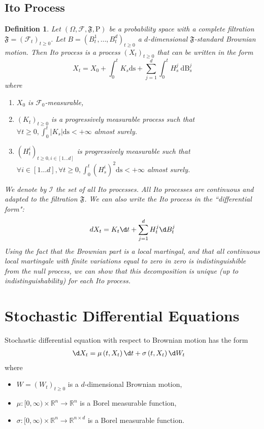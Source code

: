 \documentclass{report}
\newtheorem{definition}{Definition}[section]
\theoremstyle{nonumberplain}
\begin{document}
\section{Ito Process}
\begin{definition}
	Let $(\Omega, \mathcal{F}, \mathfrak{F}, \mathrm{P})$ be a probability space with a complete filtration $\mathfrak{F}=\left(\mathcal{F}_t\right)_{t \geq 0}$. Let $B=\left(B_t^1, \ldots, B_t^d\right)_{t \geq 0}$ a $d$-dimensional $\mathfrak{F}$-standard Brownian motion. Then Ito process is a process $\left(X_t\right)_{t \geq 0}$ that can be written in the form
$$
X_t=X_0+\int_0^t K_s \mathrm{ds}+\sum_{j=1}^d \int_0^t H_s^j \mathrm{~dB}_s^j
$$
where
\begin{enumerate}
	\item $X_0$ is $\mathcal{F}_0$-measurable,
	\item $\left(K_t\right)_{t \geq 0}$ is a progressively measurable process such that $\forall t \geq 0, \int_0^t\left|K_s\right| \mathrm{ds}<+\infty$ almost surely.
	\item $\left(H_t^i\right)_{t \geq 0, i \in[1 \ldots d]}$ is progressively measurable such that $\forall i \in[1 \ldots d], \forall t \geq 0, \int_0^t\left(H_s^i\right)^2 \mathrm{ds}<+\infty$ almost surely.
\end{enumerate}

We denote by $\mathcal{I}$ the set of all Ito processes. All Ito processes are continuous and adapted to the filtration $\mathfrak{F}$. We can also write the Ito process in the ``differential form":
$$
d X_t=K_t \d t+\sum_{j=1}^d H_t^j \d B_t^j
$$
Using the fact that the Brownian part is a local martingal, and that all continuous local martingale with finite variations equal to zero in zero is indistinguishible from the null process, we can show that this decomposition is unique (up to indistinguishability) for each Ito process.
\end{definition}


\chapter{Stochastic Differential Equations}
Stochastic differential equation with respect to Brownian motion has the form
$$
\begin{aligned}
\d X_t &=\mu\left(t, X_t\right) \d t+\sigma\left(t, X_t\right) \d W_t
\end{aligned}
$$
where
\begin{itemize}
	\item $W=\left(W_t\right)_{t\ge 0}$ is a $d$-dimensional Brownian motion,
	\item $\mu: [0,\infty) \times \mathbb{R}^n \rightarrow \mathbb{R}^n$ is a Borel measurable function,
	\item $\sigma: [0,\infty) \times \mathbb{R}^n \rightarrow \mathbb{R}^{n\times d}$ is a Borel measurable function.
\end{itemize}
\end{document}
